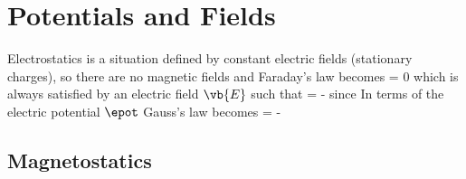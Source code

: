 \documentclass[oneside, 12pt]{book}
\begin{document}
\pagestyle{mypage2}
\chapter{Potentials and Fields} 

Electrostatics is a situation defined by constant electric fields (stationary charges), so there are no magnetic fields and Faraday's law becomes
\beq[]  = 0 \eeq
which is always satisfied by an electric field \(\vb{E}\) such that
\beq[eq:epotfield]  = -\gradi{\epot} \eeq
since
\beq[] \curl{\left(\grad{\epot} \right)}  \eeq
In terms of the electric potential \(\epot\) Gauss's law becomes
\beq[eq:laplacianepot] \laplacian{\epot} = - \eeq

\section{Magnetostatics}
\end{document}
